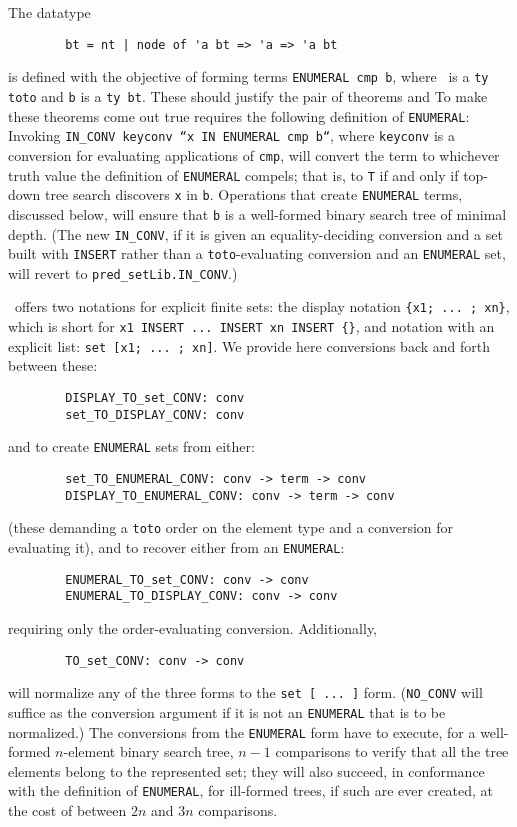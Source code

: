 The datatype
\begin{verbatim}
        bt = nt | node of 'a bt => 'a => 'a bt
\end{verbatim}
is defined with the objective of forming terms \verb$ENUMERAL cmp b$,
where \cmp\ is a \verb$ty toto$ and {\tt b} is a \verb$ty bt$. These should
justify the pair of theorems
and
To make these theorems come out true requires the following definition of
{\tt ENUMERAL}:
Invoking {\tt IN_CONV keyconv ``x IN ENUMERAL cmp b``}, where {\tt keyconv}
is a conversion for evaluating applications of {\tt cmp}, will convert
the term to whichever truth value the definition of {\tt ENUMERAL} compels;
that is, to {\tt T} if and only if top-down tree search discovers {\tt x}
in {\tt b}. Operations that create {\tt ENUMERAL} terms, discussed below,
will ensure that {\tt b} is a well-formed binary search tree of minimal depth.
(The new {\tt IN_CONV}, if it is given an equality-deciding conversion and
a set built with {\tt INSERT} rather than a {\tt toto}-evaluating
conversion and an {\tt ENUMERAL} set, will revert to {\tt pred_setLib.IN_CONV}.)

\HOL\ offers two notations for explicit finite sets: the display notation
{\tt\{x1; ...~; xn\}}, which is short for
{\tt x1 INSERT~...~INSERT xn INSERT \{\}}, and notation with an explicit list:
{\tt set [x1; ...~; xn]}. We provide here conversions back and forth
between these:
\begin{verbatim}
        DISPLAY_TO_set_CONV: conv
        set_TO_DISPLAY_CONV: conv
\end{verbatim}
and to create {\tt ENUMERAL} sets from either:
\begin{verbatim}
        set_TO_ENUMERAL_CONV: conv -> term -> conv
        DISPLAY_TO_ENUMERAL_CONV: conv -> term -> conv
\end{verbatim}
(these demanding a {\tt toto} order on the element type and a conversion
for evaluating it),
and to recover either from an {\tt ENUMERAL}:
\begin{verbatim}
        ENUMERAL_TO_set_CONV: conv -> conv
        ENUMERAL_TO_DISPLAY_CONV: conv -> conv
\end{verbatim}
requiring only the order-evaluating conversion. Additionally,
\begin{verbatim}
        TO_set_CONV: conv -> conv
\end{verbatim}
will normalize any of the three forms to the {\tt set [~...~]} form.
({\tt NO_CONV} will suffice as the conversion argument if it is not an
{\tt ENUMERAL} that is to be normalized.)
The conversions from the {\tt ENUMERAL} form have to execute, for a
well-formed $n$-element binary search tree, $n-1$ comparisons to verify
that all the tree elements belong to the represented set; they will also
succeed, in conformance with the definition of {\tt ENUMERAL}, for
ill-formed trees, if such are ever created, at the cost of between $2n$
and $3n$ comparisons.

